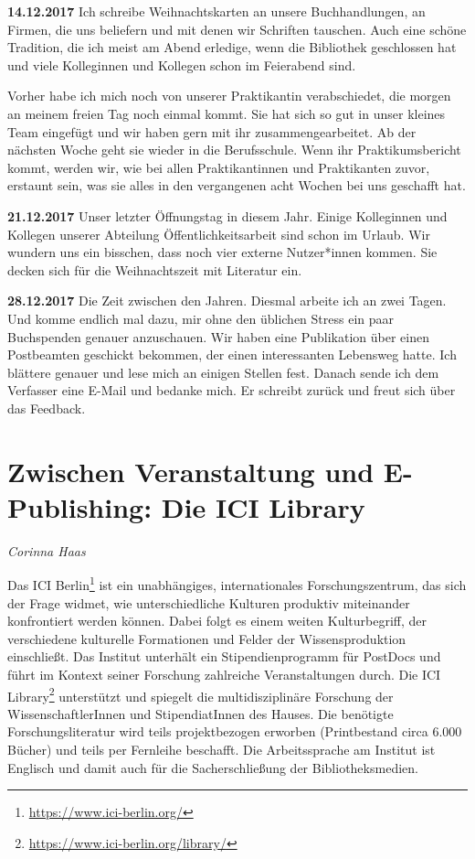 \documentclass[a4paper,
fontsize=11pt,
oneside,
numbers=noperiodatend,
parskip=half-,
bibliography=totoc,
final
]{scrartcl}
\begin{document}
\textbf{14.12.2017} Ich schreibe Weihnachtskarten an unsere
Buchhandlungen, an Firmen, die uns beliefern und mit denen wir Schriften
tauschen. Auch eine schöne Tradition, die ich meist am Abend erledige,
wenn die Bibliothek geschlossen hat und viele Kolleginnen und Kollegen
schon im Feierabend sind.

Vorher habe ich mich noch von unserer Praktikantin verabschiedet, die
morgen an meinem freien Tag noch einmal kommt. Sie hat sich so gut in
unser kleines Team eingefügt und wir haben gern mit ihr
zusammengearbeitet. Ab der nächsten Woche geht sie wieder in die
Berufsschule. Wenn ihr Praktikumsbericht kommt, werden wir, wie bei
allen Praktikantinnen und Praktikanten zuvor, erstaunt sein, was sie
alles in den vergangenen acht Wochen bei uns geschafft hat.

\textbf{21.12.2017} Unser letzter Öffnungstag in diesem Jahr. Einige
Kolleginnen und Kollegen unserer Abteilung Öffentlichkeitsarbeit sind
schon im Urlaub. Wir wundern uns ein bisschen, dass noch vier externe
Nutzer*innen kommen. Sie decken sich für die Weihnachtszeit mit
Literatur ein.

\textbf{28.12.2017} Die Zeit zwischen den Jahren. Diesmal arbeite ich an
zwei Tagen. Und komme endlich mal dazu, mir ohne den üblichen Stress ein
paar Buchspenden genauer anzuschauen. Wir haben eine Publikation über
einen Postbeamten geschickt bekommen, der einen interessanten Lebensweg
hatte. Ich blättere genauer und lese mich an einigen Stellen fest.
Danach sende ich dem Verfasser eine E-Mail und bedanke mich. Er schreibt
zurück und freut sich über das Feedback.

\hypertarget{zwischen-veranstaltung-und-e-publishing-die-ici-library}{%
\section*{Zwischen Veranstaltung und E-Publishing: Die ICI
Library}\label{zwischen-veranstaltung-und-e-publishing-die-ici-library}}

\emph{Corinna Haas}

Das ICI Berlin\footnote{\url{https://www.ici-berlin.org/}} ist ein
unabhängiges, internationales Forschungszentrum, das sich der Frage
widmet, wie unterschiedliche Kulturen produktiv miteinander konfrontiert
werden können. Dabei folgt es einem weiten Kulturbegriff, der
verschiedene kulturelle Formationen und Felder der Wissensproduktion
einschließt. Das Institut unterhält ein Stipendienprogramm für PostDocs
und führt im Kontext seiner Forschung zahlreiche Veranstaltungen durch.
Die ICI Library\footnote{\url{https://www.ici-berlin.org/library/}}
unterstützt und spiegelt die multidisziplinäre Forschung der
WissenschaftlerInnen und StipendiatInnen des Hauses. Die benötigte
Forschungsliteratur wird teils projektbezogen erworben (Printbestand
circa 6.000 Bücher) und teils per Fernleihe beschafft. Die
Arbeitssprache am Institut ist Englisch und damit auch für die
Sacherschließung der Bibliotheksmedien.
\end{document}
